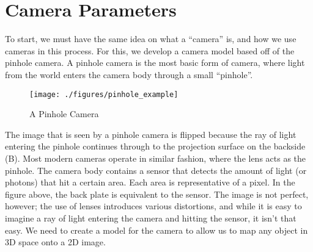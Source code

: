 \documentclass[12pt,twoside]{reedthesis}
\begin{document}
\section{Camera Parameters}
To start, we must have the same idea on what a “camera” is, and how we use cameras in this process. For this, we develop a camera model based off of the pinhole camera. A pinhole camera is the most basic form of camera, where light from the world enters the camera body through a small “pinhole”. 

\begin{figure}[h]
	   
	       \centering
	    \texttt{[image: ./figures/pinhole\_example]}
	     \caption{A Pinhole Camera}
	 \label{A Pinhole Camera}
	\end{figure}

The image that is seen by a pinhole camera is flipped because the ray of light entering the pinhole continues through to the projection surface on the backside (B). Most modern cameras operate in similar fashion, where the lens acts as the pinhole. The camera body contains a sensor that detects the amount of light (or photons) that hit a certain area. Each area is representative of a pixel. In the figure above, the back plate is equivalent to the sensor. The image is not perfect, however; the use of lenses introduces various distortions, and while it is easy to imagine a ray of light entering the camera and hitting the sensor, it isn’t that easy. We need to create a model for the camera to allow us to map any object in 3D space onto a 2D image.
\end{document}
